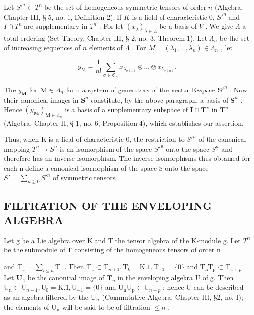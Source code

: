 Let \(S'^{n} \subset T^n\) be the set of homogeneous symmetric tensors of order \(n\) (Algebra, Chapter III, § 5, no. 1, Definition 2). If \(K\) is a field of characteristic 0, \(S'^{n}\) and \(I \cap T^n\) are supplementary in \(T^n\) . For let \((x_{\lambda})_{\lambda \in \Lambda}\) be a basis of \(V\) . We give \(\Lambda\) a total ordering (Set Theory, Chapter III, § 2, no. 3, Theorem 1). Let \(\Lambda_n\) be the set of increasing sequences of \(n\) elements of \(\Lambda\) . For \(M = (\lambda_1, \ldots, \lambda_n) \in \Lambda_n\) , let

\[
y _ {\mathrm{M}} = \frac {1}{n !} \sum_ {\sigma \in \mathfrak {S} _ {n}} x _ {\lambda_ {\sigma (1)}} \otimes \dots \otimes x _ {\lambda_ {\sigma (n)}}.
\]

The \(y_{\mathbf{M}}\) for \(\mathbf{M} \in \Lambda_n\) form a system of generators of the vector K-space \(\mathbf{S}'^n\) . Now their canonical images in \(\mathbf{S}^n\) constitute, by the above paragraph, a basis of \(\mathbf{S}^n\) . Hence \((y_{\mathbf{M}})_{\mathbf{M} \in \Lambda_n}\) is a basis of a supplementary subspace of \(\mathbf{I} \cap \mathbf{T}^n\) in \(\mathbf{T}^n\) (Algebra, Chapter II, § 1, no. 6, Proposition 4), which establishes our assertion.

Thus, when K is a field of characteristic 0, the restriction to \(S'^{n}\) of the canonical mapping \(T^{n} \rightarrow S^{n}\) is an isomorphism of the space \(S'^{n}\) onto the space \(S^{n}\) and therefore has an inverse isomorphism. The inverse isomorphisms thus obtained for each n define a canonical isomorphism of the space S onto the space \(S' = \sum_{n \geqslant 0} S'^{n}\) of symmetric tensors.

\subsection{FILTRATION OF THE ENVELOPING ALGEBRA}

Let g be a Lie algebra over K and T the tensor algebra of the K-module g. Let \(T^{n}\) be the submodule of T consisting of the homogeneous tensors of order n

and \(\mathrm{T_n} = \sum_{i\leqslant n}\mathrm{T^i}\) . Then \(\mathrm{T_n}\subset \mathrm{T}_{n + 1},\mathrm{T_0} = \mathrm{K}.1,\mathrm{T}_{-1} = \{0\}\) and \(\mathrm{T_nT_p}\subset \mathrm{T}_{n + p}\) . Let \(\mathbf{U}_n\) be the canonical image of \(\mathbf{T}_n\) in the enveloping algebra U of g. Then \(\mathrm{U_n}\subset \mathrm{U}_{n + 1},\mathrm{U_0} = \mathrm{K}.1,\mathrm{U}_{-1} = \{0\}\) and \(\mathrm{U_nU_p}\subset \mathrm{U}_{n + p}\) ; hence U can be described as an algebra filtered by the \(\mathbf{U}_n\) (Commutative Algebra, Chapter III, §2, no. I); the elements of \(\mathrm{U_n}\) will be said to be of filtration \(\leqslant n\) .


